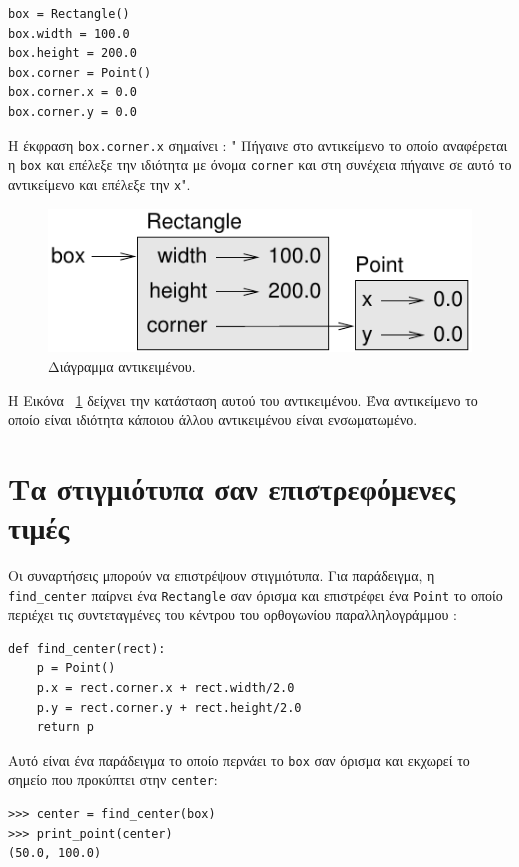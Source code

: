 \documentclass[10pt]{book}
\begin{document}
\begin{verbatim}
box = Rectangle()
box.width = 100.0
box.height = 200.0
box.corner = Point()
box.corner.x = 0.0
box.corner.y = 0.0
\end{verbatim}
%
 Η έκφραση  {\tt box.corner.x}  σημαίνει : " Πήγαινε στο αντικείμενο το οποίο αναφέρεται η  {\tt box}  και επέλεξε την ιδιότητα με όνομα  {\tt corner}  και στη συνέχεια πήγαινε σε αυτό το αντικείμενο και επέλεξε την  {\tt x}".

\begin{figure}
\centerline
{\includegraphics[scale=0.8]{figs/rectangle.pdf}}
 \caption{Διάγραμμα αντικειμένου.} 
\label{fig.rectangle}
\end{figure}


 Η Εικόνα~ \ref{fig.rectangle}  δείχνει την κατάσταση αυτού του αντικειμένου.
 Ένα αντικείμενο το οποίο είναι ιδιότητα κάποιου άλλου αντικειμένου είναι ενσωματωμένο.


\section{Τα στιγμιότυπα σαν επιστρεφόμενες τιμές}

Οι συναρτήσεις μπορούν να επιστρέψουν στιγμιότυπα. Για παράδειγμα, η  \verb"find_center"  παίρνει ένα  {\tt Rectangle}  σαν όρισμα και επιστρέφει ένα  {\tt Point}  το οποίο περιέχει τις συντεταγμένες του κέντρου του ορθογωνίου παραλληλογράμμου :

\begin{verbatim}
def find_center(rect):
    p = Point()
    p.x = rect.corner.x + rect.width/2.0
    p.y = rect.corner.y + rect.height/2.0
    return p
\end{verbatim}
%
 Αυτό είναι ένα παράδειγμα το οποίο περνάει το  {\tt box}  σαν όρισμα και εκχωρεί το σημείο που προκύπτει στην  
{\tt center}:

\begin{verbatim}
>>> center = find_center(box)
>>> print_point(center)
(50.0, 100.0)
\end{verbatim}
%
\end{document}
